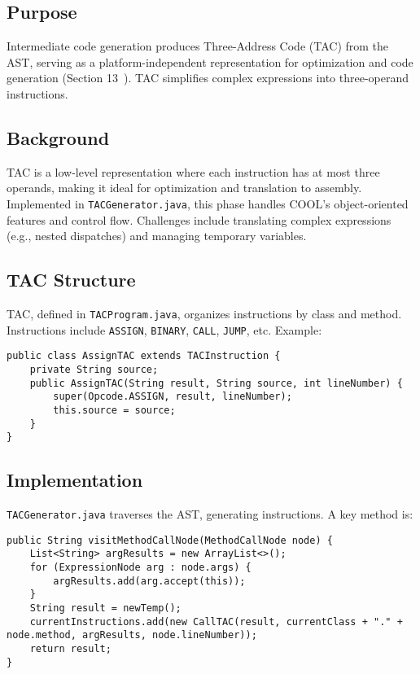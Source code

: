 \documentclass[11pt, titlepage]{article}
\begin{document}
\subsection{Purpose}
Intermediate code generation produces Three-Address Code (TAC) from the AST, serving as a platform-independent representation for optimization and code generation (Section 13~\cite{cool_manual}). TAC simplifies complex expressions into three-operand instructions.

\subsection{Background}
TAC is a low-level representation where each instruction has at most three operands, making it ideal for optimization and translation to assembly. Implemented in \texttt{TACGenerator.java}, this phase handles COOL's object-oriented features and control flow. Challenges include translating complex expressions (e.g., nested dispatches) and managing temporary variables.

\subsection{TAC Structure}
TAC, defined in \texttt{TACProgram.java}, organizes instructions by class and method. Instructions include \texttt{ASSIGN}, \texttt{BINARY}, \texttt{CALL}, \texttt{JUMP}, etc. Example:

\begin{lstlisting}
public class AssignTAC extends TACInstruction {
    private String source;
    public AssignTAC(String result, String source, int lineNumber) {
        super(Opcode.ASSIGN, result, lineNumber);
        this.source = source;
    }
}
\end{lstlisting}

\subsection{Implementation}
\texttt{TACGenerator.java} traverses the AST, generating instructions. A key method is:

\begin{lstlisting}
public String visitMethodCallNode(MethodCallNode node) {
    List<String> argResults = new ArrayList<>();
    for (ExpressionNode arg : node.args) {
        argResults.add(arg.accept(this));
    }
    String result = newTemp();
    currentInstructions.add(new CallTAC(result, currentClass + "." + node.method, argResults, node.lineNumber));
    return result;
}
\end{lstlisting}
\end{document}
